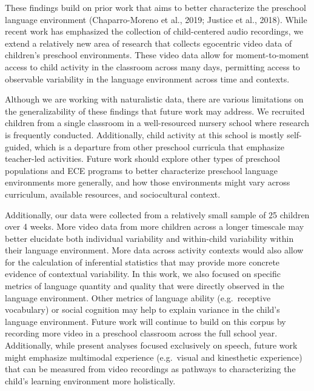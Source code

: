 \documentclass[10pt, letterpaper]{article}
\begin{document}
These findings build on prior work that aims to better characterize the
preschool language environment (Chaparro-Moreno et al., 2019; Justice et
al., 2018). While recent work has emphasized the collection of
child-centered audio recordings, we extend a relatively new area of
research that collects egocentric video data of children's preschool
environments. These video data allow for moment-to-moment access to
child activity in the classroom across many days, permitting access to
observable variability in the language environment across time and
contexts.

Although we are working with naturalistic data, there are various
limitations on the generalizability of these findings that future work
may address. We recruited children from a single classroom in a
well-resourced nursery school where research is frequently conducted.
Additionally, child activity at this school is mostly self-guided, which
is a departure from other preschool curricula that emphasize teacher-led
activities. Future work should explore other types of preschool
populations and ECE programs to better characterize preschool language
environments more generally, and how those environments might vary
across curriculum, available resources, and sociocultural context.

Additionally, our data were collected from a relatively small sample of
25 children over 4 weeks. More video data from more children across a
longer timescale may better elucidate both individual variability and
within-child variability within their language environment. More data
across activity contexts would also allow for the calculation of
inferential statistics that may provide more concrete evidence of
contextual variability. In this work, we also focused on specific
metrics of language quantity and quality that were directly observed in
the language environment. Other metrics of language ability
(e.g.~receptive vocabulary) or social cognition may help to explain
variance in the child's language environment. Future work will continue
to build on this corpus by recording more video in a preschool classroom
across the full school year. Additionally, while present analyses
focused exclusively on speech, future work might emphasize multimodal
experience (e.g.~visual and kinesthetic experience) that can be measured
from video recordings as pathways to characterizing the child's learning
environment more holistically.
\end{document}
